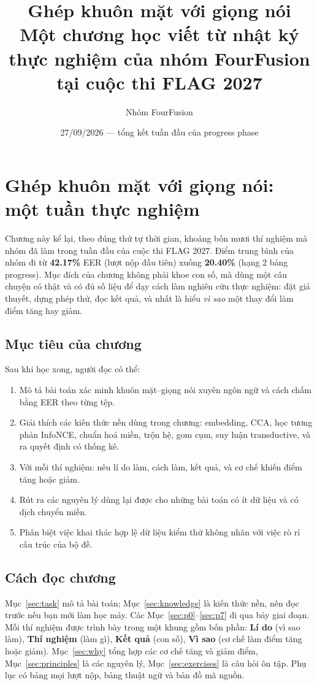 \documentclass[11pt,a4paper,oneside]{report}
\title{\textbf{Ghép khuôn mặt với giọng nói}\\[6pt]
\Large Một chương học viết từ nhật ký thực nghiệm của nhóm FourFusion\\ tại cuộc thi FLAG 2027}
\author{Nhóm FourFusion}
\date{27/09/2026 --- tổng kết tuần đầu của progress phase}
\newcommand{\key}[1]{\textbf{\color{accent}#1}}
\begin{document}
\maketitle
\tableofcontents

\chapter{Ghép khuôn mặt với giọng nói: một tuần thực nghiệm}

Chương này kể lại, theo đúng thứ tự thời gian, khoảng bốn mươi thí nghiệm mà nhóm đã làm trong tuần đầu của cuộc thi FLAG 2027. Điểm trung bình của nhóm đi từ \textbf{42.17\%} EER (lượt nộp đầu tiên) xuống \textbf{20.40\%} (hạng 2 bảng progress). Mục đích của chương không phải khoe con số, mà dùng một câu chuyện có thật và có đủ số liệu để dạy cách làm nghiên cứu thực nghiệm: đặt giả thuyết, dựng phép thử, đọc kết quả, và nhất là hiểu \emph{vì sao} một thay đổi làm điểm tăng hay giảm.

\section*{Mục tiêu của chương}
Sau khi học xong, người đọc có thể:
\begin{enumerate}
\item Mô tả bài toán xác minh khuôn mặt--giọng nói xuyên ngôn ngữ và cách chấm bằng EER theo từng tệp.
\item Giải thích các kiến thức nền dùng trong chương: embedding, CCA, học tương phản InfoNCE, chuẩn hoá miền, trộn hệ, gom cụm, suy luận transductive, và ra quyết định có thống kê.
\item Với mỗi thí nghiệm: nêu lí do làm, cách làm, kết quả, và cơ chế khiến điểm tăng hoặc giảm.
\item Rút ra các nguyên lý dùng lại được cho những bài toán có ít dữ liệu và có dịch chuyển miền.
\item Phân biệt việc khai thác hợp lệ dữ liệu kiểm thử không nhãn với việc rò rỉ cấu trúc của bộ đề.
\end{enumerate}

\section*{Cách đọc chương}
Mục~\ref{sec:task} mô tả bài toán; Mục~\ref{sec:knowledge} là kiến thức nền, nên đọc trước nếu bạn mới làm học máy. Các Mục~\ref{sec:p0}--\ref{sec:p7} đi qua bảy giai đoạn. Mỗi thí nghiệm được trình bày trong một khung gồm bốn phần: \key{Lí do} (vì sao làm), \key{Thí nghiệm} (làm gì), \key{Kết quả} (con số), \key{Vì sao} (cơ chế làm điểm tăng hoặc giảm). Mục~\ref{sec:why} tổng hợp các cơ chế tăng và giảm điểm, Mục~\ref{sec:principles} là các nguyên lý, Mục~\ref{sec:exercises} là câu hỏi ôn tập. Phụ lục có bảng mọi lượt nộp, bảng thuật ngữ và bản đồ mã nguồn.
\end{document}
